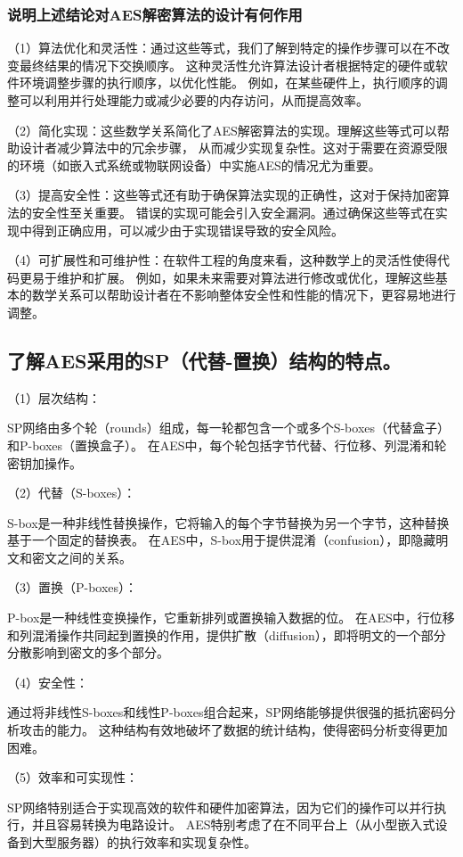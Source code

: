 \documentclass[a4paper,11pt,UTF8]{ctexart}
\begin{document}
        \subsubsection{说明上述结论对AES解密算法的设计有何作用}
            （1）算法优化和灵活性：通过这些等式，我们了解到特定的操作步骤可以在不改变最终结果的情况下交换顺序。
                这种灵活性允许算法设计者根据特定的硬件或软件环境调整步骤的执行顺序，以优化性能。
                例如，在某些硬件上，执行顺序的调整可以利用并行处理能力或减少必要的内存访问，从而提高效率。\par
            （2）简化实现：这些数学关系简化了AES解密算法的实现。理解这些等式可以帮助设计者减少算法中的冗余步骤，
                从而减少实现复杂性。这对于需要在资源受限的环境（如嵌入式系统或物联网设备）中实施AES的情况尤为重要。\par
            （3）提高安全性：这些等式还有助于确保算法实现的正确性，这对于保持加密算法的安全性至关重要。
                错误的实现可能会引入安全漏洞。通过确保这些等式在实现中得到正确应用，可以减少由于实现错误导致的安全风险。\par
            （4）可扩展性和可维护性：在软件工程的角度来看，这种数学上的灵活性使得代码更易于维护和扩展。
                例如，如果未来需要对算法进行修改或优化，理解这些基本的数学关系可以帮助设计者在不影响整体安全性和性能的情况下，更容易地进行调整。
            
    \subsection{了解AES采用的SP（代替-置换）结构的特点。}
        （1）层次结构：\par
            SP网络由多个轮（rounds）组成，每一轮都包含一个或多个S-boxes（代替盒子）和P-boxes（置换盒子）。
            在AES中，每个轮包括字节代替、行位移、列混淆和轮密钥加操作。\par
        （2）代替（S-boxes）：\par
            S-box是一种非线性替换操作，它将输入的每个字节替换为另一个字节，这种替换基于一个固定的替换表。
            在AES中，S-box用于提供混淆（confusion），即隐藏明文和密文之间的关系。\par
        （3）置换（P-boxes）：\par
            P-box是一种线性变换操作，它重新排列或置换输入数据的位。
            在AES中，行位移和列混淆操作共同起到置换的作用，提供扩散（diffusion），即将明文的一个部分分散影响到密文的多个部分。\par
        （4）安全性：\par
            通过将非线性S-boxes和线性P-boxes组合起来，SP网络能够提供很强的抵抗密码分析攻击的能力。
            这种结构有效地破坏了数据的统计结构，使得密码分析变得更加困难。\par
        （5）效率和可实现性：\par
            SP网络特别适合于实现高效的软件和硬件加密算法，因为它们的操作可以并行执行，并且容易转换为电路设计。
            AES特别考虑了在不同平台上（从小型嵌入式设备到大型服务器）的执行效率和实现复杂性。\par
\end{document}

